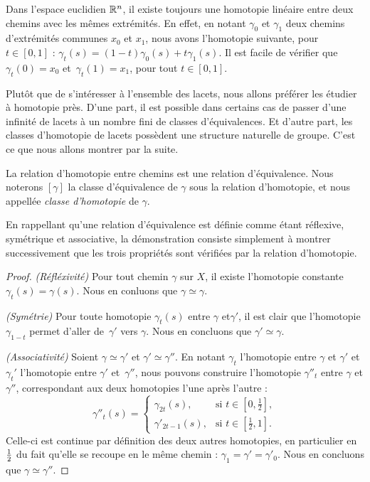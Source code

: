 \begin{exemple}
Dans l'espace euclidien $\mathbb{R}^n$, il existe toujours une homotopie linéaire entre deux chemins avec les mêmes extrémités. En effet, en notant $\gamma_0$ et $\gamma_1$ deux chemins d'extrémités communes $x_0$ et $x_1$, nous avons l'homotopie suivante, pour~$t\in[0,1]$ :  $\gamma_t(s)=(1-t)\gamma_0(s)+t\gamma_1(s)$. Il est facile de vérifier que $\gamma_t(0)=x_0$ et~$\gamma_t(1)=x_1$, pour tout $t\in[0,1]$.
\end{exemple}

Plutôt que de s'intéresser à l'ensemble des lacets, nous allons préférer les étudier à homotopie près. D'une part, il est possible dans certains cas de passer d'une infinité de lacets à un nombre fini de classes d'équivalences. Et d'autre part, les classes d'homotopie de lacets possèdent une structure naturelle de groupe. C'est ce que nous allons montrer par la suite.

\begin{proposition}
La relation d'homotopie entre chemins est une relation d'équivalence. Nous noterons $[\gamma]$ la classe d'équivalence de $\gamma$ sous la relation d'homotopie, et nous appellée \emph{classe d'homotopie} de $\gamma$.
\end{proposition}

En rappellant qu'une relation d'équivalence est définie comme étant réflexive, symétrique et associative, la démonstration consiste simplement à montrer successivement que les trois propriétés sont vérifiées par la relation d'homotopie.
\begin{proof}
\textit{(Réfléxivité)} Pour tout chemin $\gamma$ sur $X$, il existe l'homotopie constante $\gamma_t(s)=\gamma(s)$. Nous en conluons que $\gamma\simeq\gamma$.

\textit{(Symétrie)} Pour toute homotopie $\gamma_t(s)$ entre $\gamma$ et$\gamma'$, il est clair que l'homotopie $\gamma_{1-t}$ permet d'aller de~$\gamma'$ vers $\gamma$. Nous en concluons que $\gamma'\simeq\gamma$.

\textit{(Associativité)} Soient $\gamma\simeq\gamma'$ et $\gamma'\simeq\gamma''$. En notant $\gamma_t$ l'homotopie entre $\gamma$ et $\gamma'$ et $\gamma_t'$ l'homotopie entre $\gamma'$ et~$\gamma''$, nous pouvons  construire l'homotopie $\gamma''_t$ entre $\gamma$ et $\gamma''$, correspondant aux deux homotopies l'une après l'autre : \[\gamma''_t(s)= \left\{\begin{matrix}
\gamma_{2t}(s),&\text{si }t\in[0,\frac{1}{2}], \\
\gamma'_{2t-1}(s),&\text{si }t\in[\frac{1}{2},1].
\end{matrix}\right.\]Celle-ci est continue par définition des deux autres homotopies, en particulier en $1\over 2$ du fait qu'elle se recoupe en le même chemin : $\gamma_1=\gamma'=\gamma'_0$. Nous en concluons que $\gamma\simeq\gamma''$.
\end{proof}

